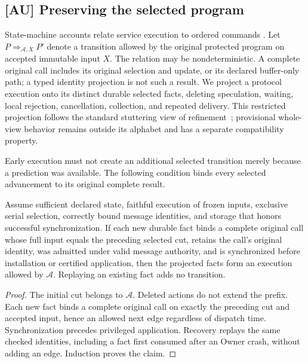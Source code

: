 \subsection{[AU] Preserving the selected program}
\label{subsec:native_refinement}
State-machine accounts relate service execution to ordered commands
\cite{schneider1990statemachine}. Let $P \mathrel{\Rightarrow_{\mathcal A,X}} P'$ denote a transition allowed
by the original protected program on accepted immutable input $X$.
The relation may be nondeterministic. A complete original call includes
its original selection and update, or its declared buffer-only path;
a typed identity projection is not such a result. We project a protocol
execution onto its distinct durable selected facts, deleting speculation,
waiting, local rejection, cancellation, collection, and repeated delivery.
This restricted projection follows the standard stuttering view of
refinement~\cite{abadi1991refinement}; provisional whole-view behavior
remains outside its alphabet and has a separate compatibility property.

Early execution must not create an additional selected transition merely
because a prediction was available. The following condition binds every
selected advancement to its original complete result.
\begin{proposition}
\label{prop:refinement}
Assume sufficient declared state, faithful execution of frozen inputs,
exclusive serial selection, correctly bound message identities, and
storage that honors successful synchronization. If each new durable fact
binds a complete original call whose full input equals the preceding
selected cut, retains the call's original identity, was admitted under
valid message authority, and is synchronized before installation or certified
application, then the projected facts form an execution allowed by
$\mathcal A$. Replaying an existing fact adds no transition.
\end{proposition}
\begin{proof}
The initial cut belongs to $\mathcal A$. Deleted actions do not extend
the prefix. Each new fact binds a complete original call on exactly the
preceding cut and accepted input, hence an allowed next edge regardless
of dispatch time. Synchronization precedes privileged application.
Recovery replays the same checked identities, including a fact first
consumed after an Owner crash, without adding an edge. Induction proves
the claim.
\end{proof}

